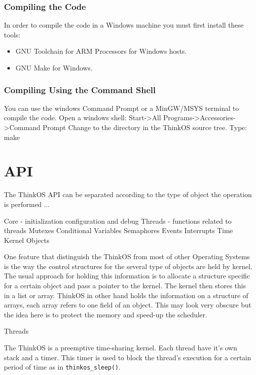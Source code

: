 \subsubsection{Compiling the Code}

In order to compile the code in a Windows machine you must first install these tools:
\begin{itemize}
\item GNU Toolchain for ARM Processors for Windows hosts.
\item GNU Make for Windows.
\end{itemize}

\subsubsection{Compiling Using the Command Shell}

You can use the windows Command Prompt or a MinGW/MSYS terminal to compile the code.
Open a windows shell: Start->All Programs->Accessories->Command Prompt
Change to the directory  in the ThinkOS source tree.
Type: make

\section{API}

The ThinkOS API can be separated according to the type of object the operation is performed ...

Core - initialization configuration and debug Threads - functions related to threads Mutexes Conditional Variables Semaphores Events Interrupts Time Kernel Objects

One feature that distinguish the ThinkOS from most of other Operating Systems is the way the control structures for the several type of objects are held by kernel. The usual approach for holding this information is to allocate a structure specific for a certain object and pass a pointer to the kernel. The kernel then stores this in a list or array. ThinkOS in other hand holds the information on a structure of arrays, each array refers to one field of an object. This may look very obscure but the idea here is to protect the memory and speed-up the scheduler.

Threads

The ThinkOS is a preemptive time-sharing kernel. Each thread have it's own stack and a timer. This timer is used to block the thread's execution for a certain period of time as in \lstinline{thinkos_sleep()}.

